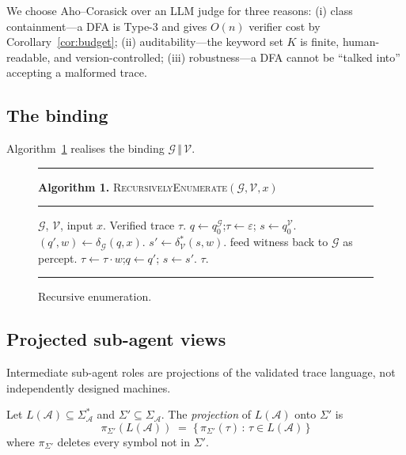 \noindent We choose Aho--Corasick over an LLM judge for three
reasons: (i) class containment---a DFA is Type-3 and gives $O(n)$
verifier cost by Corollary~\ref{cor:budget}; (ii) auditability---the
keyword set $K$ is finite, human-readable, and version-controlled;
(iii) robustness---a DFA cannot be ``talked into'' accepting a
malformed trace.

\subsection{The binding}

Algorithm~\ref{alg:enum} realises the binding
$\mathcal{G}\,\Vert\,\mathcal{V}$.

\begin{figure}[ht]
\noindent\rule{\columnwidth}{0.4pt}
\textbf{Algorithm 1.} \textsc{RecursivelyEnumerate}$(\mathcal{G},
\mathcal{V}, x)$
\par\noindent\rule{\columnwidth}{0.4pt}
\begin{algorithmic}[1]
\REQUIRE $\mathcal{G}$, $\mathcal{V}$, input $x$.
\ENSURE Verified trace $\tau$. \STATE
$q\gets q_0^\mathcal{G}$;\quad $\tau\gets\varepsilon$;\quad
$s\gets q_0^\mathcal{V}$.
\LOOP
  \STATE $(q', w) \gets \delta_\mathcal{G}(q, x)$.
  \STATE $s' \gets \delta_\mathcal{V}^*(s, w)$.
    \STATE feed witness back to $\mathcal{G}$ as percept.
  \ELSE
    \STATE $\tau \gets \tau\cdot w$;\quad $q\gets q'$;\quad
    $s\gets s'$.
      \RETURN $\tau$.
    \ENDIF
  \ENDIF
\ENDLOOP
\end{algorithmic}
\rule{\columnwidth}{0.4pt}
\caption{Recursive enumeration.}
\label{alg:enum}
\end{figure}

\subsection{Projected sub-agent views}

Intermediate sub-agent roles are projections of the validated trace
language, not independently designed machines.

\begin{definition}[Projection]
\label{def:projection}
Let $L(\mathcal{A})\subseteq \Sigma_\mathcal{A}^*$ and
$\Sigma' \subseteq \Sigma_\mathcal{A}$.  The \emph{projection} of
$L(\mathcal{A})$ onto $\Sigma'$ is
\[
\pi_{\Sigma'}(L(\mathcal{A})) \;=\;
\{\,\pi_{\Sigma'}(\tau) \,:\, \tau\in L(\mathcal{A})\,\}
\]
where $\pi_{\Sigma'}$ deletes every symbol not in $\Sigma'$.
\end{definition}

